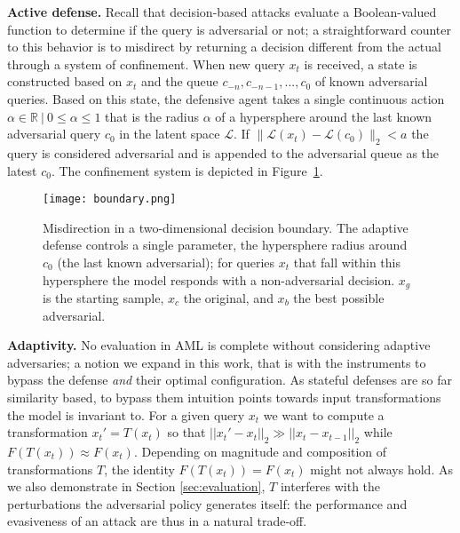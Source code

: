 \textbf{Active defense.} Recall that decision-based attacks evaluate a Boolean-valued function to determine if the query is adversarial or not; a straightforward counter to this behavior is to misdirect by returning a decision different from the actual through a system of confinement.
When new query $x_t$ is received, a state is constructed based on $x_t$ and the queue $c_{-n}, c_{-n-1}, ..., c_{0}$ of known adversarial queries.
Based on this state, the defensive agent takes a single continuous action $\alpha \in \mathbb{R} \:|\: 0\leq \alpha \leq1$ that is the radius $\alpha$ of a hypersphere around the last known adversarial query $c_0$ in the latent space $\mathcal{L}$.
If $\|\mathcal{L}(x_t) - \mathcal{L}(c_0)\|_2 < a$ the query is considered adversarial and is appended to the adversarial queue as the latest $c_0$.
The confinement system is depicted in Figure~\ref{fig:boundary}.

\begin{figure}
    \centering
    \texttt{[image: boundary.png]}
    \caption{Misdirection in a two-dimensional decision boundary. The adaptive defense controls a single parameter, the hypersphere radius around $c_0$ (the last known adversarial); for queries $x_t$ that fall within this hypersphere the model responds with a non-adversarial decision. $x_g$ is the starting sample, $x_c$ the original, and $x_b$ the best possible adversarial.}
    \label{fig:boundary}
\end{figure}

\textbf{Adaptivity.} No evaluation in \gls{AML} is complete without considering adaptive adversaries; a notion we expand in this work, that is with the instruments to bypass the defense \textit{and} their optimal configuration.
As stateful defenses are so far similarity based, to bypass them intuition points towards input transformations the model is invariant to.
For a given query $x_t$ we want to compute a transformation $x_t' = T(x_t)$ so that $||x_t' - x_t||_2 \gg ||x_t - x_{t-1}||_2$ while $F(T(x_t)) \approx F(x_t)$.
Depending on magnitude and composition of transformations $T$, the identity $F(T(x_t)) = F(x_t)$ might not always hold.
As we also demonstrate in Section \ref{sec:evaluation}, $T$ interferes with the perturbations the adversarial policy generates itself: the performance and evasiveness of an attack are thus in a natural trade-off.

